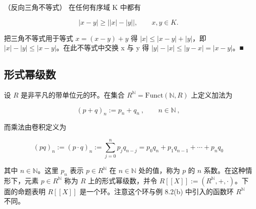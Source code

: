 \begin{corollary}

（反向三角不等式） 在任何有序域 K 中都有

\[
\left|x-y\right|\geq\left|\left|x\right|-\left|y\right|\right|,\qquad x,y\in K.
\]

\proofhead
把三角不等式用于等式  $ x = (x - y) + y $ 得  $ |x| \leq |x - y| + |y| $，即  $ |x| - |y| \leq |x - y| $。在此不等式中交换 x 与 y 得  $ |y| - |x| \leq |y - x| = |x - y| $。■
\end{corollary}

\subsection*{形式幂级数}

设 $R$ 是非平凡的带单位元的环。在集合 $R^{\mathbb{N}} = \mathrm{Funct}(\mathbb{N}, R)$ 上定义加法为

\begin{equation}
(p+q)_{n}:=p_{n}+q_{n}~,\qquad n\in\mathbb{N}~,
\end{equation}

而乘法由卷积定义为

\begin{equation}
(pq)_{n}:=(p\cdot q)_{n}:=\sum_{j=0}^{n} p_{j} q_{n-j}=p_{0}q_{n}+p_{1}q_{n-1}+\cdots+p_{n} q_{0}
\end{equation}

其中 $n \in \mathbb{N}$。这里 $p_n$ 表示 $p \in R^{\mathbb{N}}$ 在 $n \in \mathbb{N}$ 处的值，称为 $p$ 的 $n$ 系数。在这种情形下，元素 $p \in R^{\mathbb{N}}$ 称为 $R$ 上的形式幂级数，并令 $R[[X]] := (R^{\mathbb{N}}, +, \cdot)$。下面的命题表明 $R[[X]]$ 是一个环。注意这个环与例 8.2(b) 中引入的函数环 $R^{\mathbb{N}}$ 不同。

